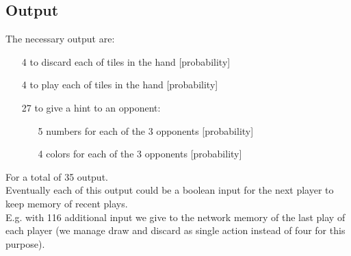 \documentclass[]{article}
\begin{document}
\subsection{Output}
The necessary output are:
\begin{itemize}
	\item[4] to discard each of tiles in the hand [probability]
	\item[4] to play each of tiles in the hand [probability]
	\item[27] to give a hint to an opponent:
	\begin{itemize}
		\item[5] numbers for each of the 3 opponents [probability]
		\item[4] colors for each of the 3 opponents [probability]
	\end{itemize}
\end{itemize}
For a total of 35 output. \\
Eventually each of this output could be a boolean input for the next player to keep memory of recent plays. \\
E.g. with 116 additional input we give to the network memory of the last play of each player (we manage draw and discard as single action instead of four for this purpose).
\end{document}
